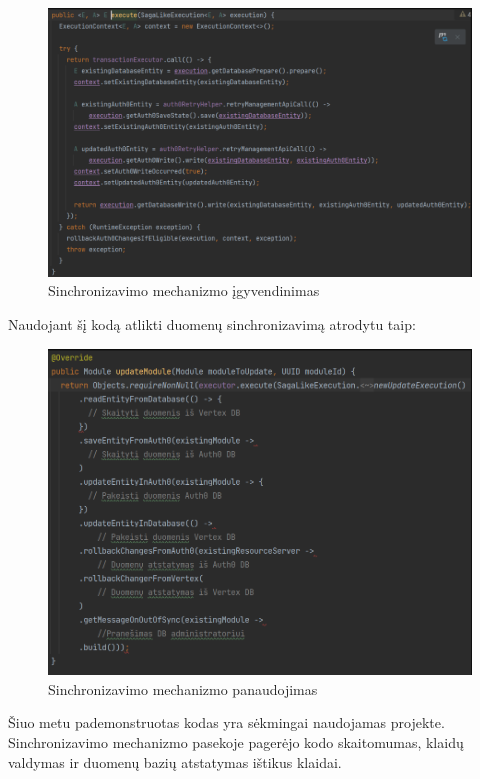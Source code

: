 \documentclass{VUMIFPSkursinis}
\begin{document}
			\begin{figure}[H]
			\includegraphics[scale=0.5]{img/six}
			\caption{Sinchronizavimo mechanizmo įgyvendinimas} %
			\label{img:kurimoProcesas}
			\end{figure}

		Naudojant šį kodą atlikti duomenų sinchronizavimą atrodytu taip:

			\begin{figure}[H]
			\includegraphics[scale=0.7]{img/seven}
			\caption{Sinchronizavimo mechanizmo panaudojimas} %
			\label{img:kurimoProcesas}
			\end{figure}

		Šiuo metu pademonstruotas kodas yra sėkmingai naudojamas projekte.
		Sinchronizavimo mechanizmo pasekoje pagerėjo kodo skaitomumas, klaidų valdymas ir duomenų bazių atstatymas ištikus klaidai.
		
\end{document}

